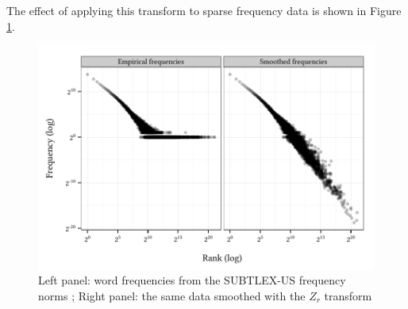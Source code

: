 \noindent The effect of applying this transform to sparse frequency data is shown in Figure \ref{subtlex}.

\begin{figure}[t]
\centering
\includegraphics{zr.pdf}
\caption{Left panel: word frequencies from the SUBTLEX-US frequency norms \citep{Brysbaert2009}; Right panel: the same data smoothed with the $Z_r$ transform}
\label{subtlex}
\end{figure}
